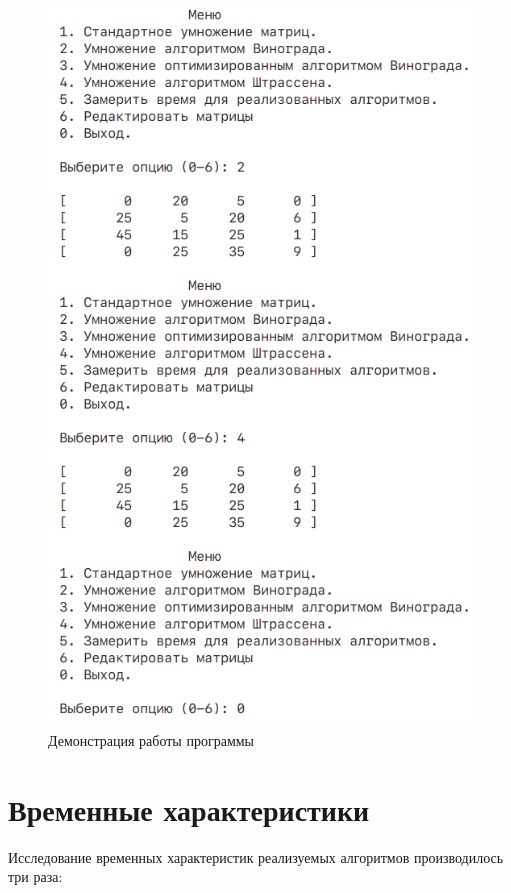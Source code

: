 \begin{figure}[H]
    \centering
    \includegraphics[height=0.6\textheight]{images/prog_demo.png}
    \caption{Демонстрация работы программы}
    \label{fig:prog-demo}
\end{figure}

\section{Временные характеристики}

Исследование временных характеристик реализуемых алгоритмов производилось три раза:

